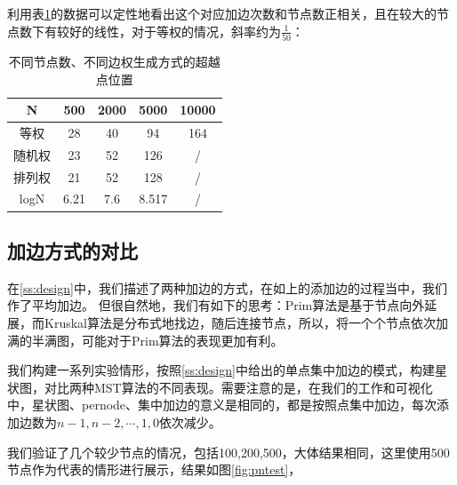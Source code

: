 \documentclass[UTF8]{ctexart}
\begin{document}
利用表\ref{tab:suppoint}的数据可以定性地看出这个对应加边次数和节点数正相关，且在较大的节点数下有较好的线性，对于等权的情况，斜率约为\(\frac{1}{50}\)：

\begin{table}[htbp]
    \centering
    \begin{tabular}{|c|c|c|c|c|}
    \hline
    N    & 500  & 2000 & 5000  & 10000 \\ \hline
    等权   & 28   & 40   & 94    & 164   \\ \hline
    随机权  & 23   & 52   & 126   & /     \\ \hline
    排列权  & 21   & 52   & 128   & /     \\ \hline
    logN & 6.21 & 7.6  & 8.517 & /     \\ \hline
    \end{tabular}
    \caption{不同节点数、不同边权生成方式的超越点位置}
    \label{tab:suppoint}
\end{table}

\subsection{加边方式的对比}
在\ref{ss:design}中，我们描述了两种加边的方式，在如上的添加边的过程当中，我们作了平均加边。 但很自然地，我们有如下的思考：Prim算法是基于节点向外延展，而Kruskal算法是分布式地找边，随后连接节点，所以，将一个个节点依次加满的半满图，可能对于Prim算法的表现更加有利。

我们构建一系列实验情形，按照\ref{ss:design}中给出的单点集中加边的模式，构建星状图，对比两种MST算法的不同表现。需要注意的是，在我们的工作和可视化中，星状图、pernode、集中加边的意义是相同的，都是按照点集中加边，每次添加边数为\(n-1,n-2,\cdots,1,0\)依次减少。

我们验证了几个较少节点的情况，包括100,200,500，大体结果相同，这里使用500节点作为代表的情形进行展示，结果如图\ref{fig:pntest}， 
\end{document}
